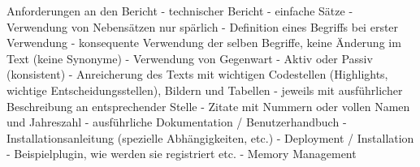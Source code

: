 \documentclass[
	11pt,
	a4paper,
	bibtotocnumbered
	]{scrreprt}
\begin{document}
\begin{singlespace}

\setcounter{page}{1}
\end{singlespace}

\tableofcontents

\cleardoublepage





Anforderungen an den Bericht
- technischer Bericht
- einfache Sätze
- Verwendung von Nebensätzen nur spärlich
- Definition eines Begriffs bei erster Verwendung
- konsequente Verwendung der selben Begriffe, keine Änderung im Text (keine Synonyme)
- Verwendung von Gegenwart
- Aktiv oder Passiv (konsistent)
- Anreicherung des Texts mit wichtigen Codestellen (Highlights, wichtige Entscheidungsstellen), Bildern und Tabellen
- jeweils mit ausführlicher Beschreibung an entsprechender Stelle
- Zitate mit Nummern oder vollen Namen und Jahreszahl
- ausführliche Dokumentation / Benutzerhandbuch 
- Installationsanleitung (spezielle Abhängigkeiten, etc.)
- Deployment / Installation
- Beispielplugin, wie werden sie registriert etc.
- Memory Management










\begin{singlespace}
\printbibliography
\end{singlespace}

\end{document}
